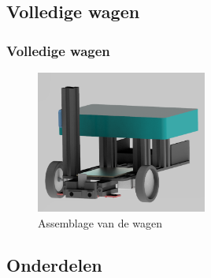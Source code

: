 \documentclass
   [kulak] %
   {kulakbeamer}
\begin{document}
%	

\subsection{Volledige wagen}
\begin{frame}
	\frametitle{Volledige wagen}
	\begin{figure}
		\centering
		\includegraphics[width=0.50\textwidth]{4Volledig}
		\caption{Assemblage van de wagen}
	\end{figure}
\end{frame}

\subsection{Onderdelen}
\end{document}
